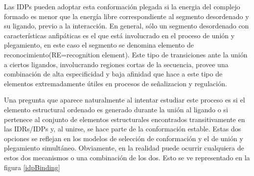 Las IDPs pueden adoptar esta conformación plegada si la energia del complejo formado es menor que la energía libre correspondiente al segmento desordenado y su ligando, previo a la interacción.
En general, sólo un segmento desordenado con características anfipáticas es el que está involucrado en el proceso de unión y plegamiento, en este caso el segmento se denomina elemento de reconocimiento(RE=recognition element). 
Este tipo de transiciones ante la unión a ciertos ligandos, involucrando regiones cortas de la secuencia, provee una combinación de alta especificidad y baja afinidad que hace a este tipo de elementos extremadamente útiles en procesos de señalizacion y regulación.

Una pregunta que aparece naturalmente al intentar estudiar este proceso es si el elemento estructural ordenado es generado durante la unión al ligando 
o si pertenece al conjunto de elementos estructurales encontrados transitivamente en las IDRs/IDPs y, al unirse, se hace parte de la conformación estable.
Estas dos opciones se reflejan en los modelos de selección de conformación y el de unión y plegamiento simultáneo.
Obviamente, en la realidad puede ocurrir cualquiera de estos dos mecanismos o una combinación de los dos.
Esto se ve representado en la figura \ref{idpBinding}


